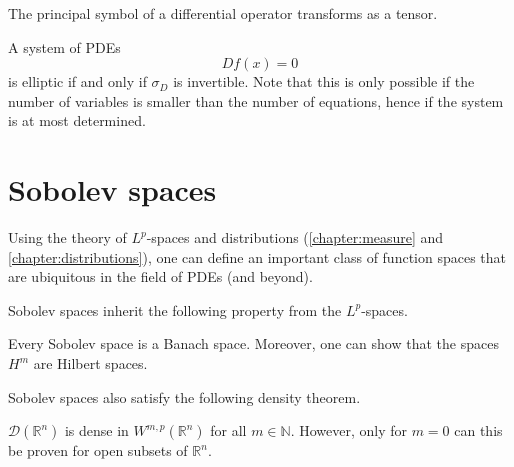     \begin{property}
        The principal symbol of a differential operator transforms as a tensor.
    \end{property}
    \begin{definition}[Ellipticity]
        A system of PDEs \[Df(x) = 0\] is elliptic if and only if $\sigma_D$ is invertible. Note that this is only possible if the number of variables is smaller than the number of equations, hence if the system is at most determined.
    \end{definition}

\section{Sobolev spaces}

    Using the theory of $L^p$-spaces and distributions (\cref{chapter:measure} and \cref{chapter:distributions}), one can define an important class of function spaces that are ubiquitous in the field of PDEs (and beyond).


    Sobolev spaces inherit the following property from the $L^p$-spaces.
    \begin{property}[Completeness]
        Every Sobolev space is a Banach space. Moreover, one can show that the spaces $H^m$ are Hilbert spaces.
    \end{property}
    Sobolev spaces also satisfy the following density theorem.
    \begin{property}
        $\mathcal{D}(\mathbb{R}^n)$ is dense in $W^{m,p}(\mathbb{R}^n)$ for all $m\in\mathbb{N}$. However, only for $m=0$ can this be proven for open subsets of $\mathbb{R}^n$.
    \end{property}


